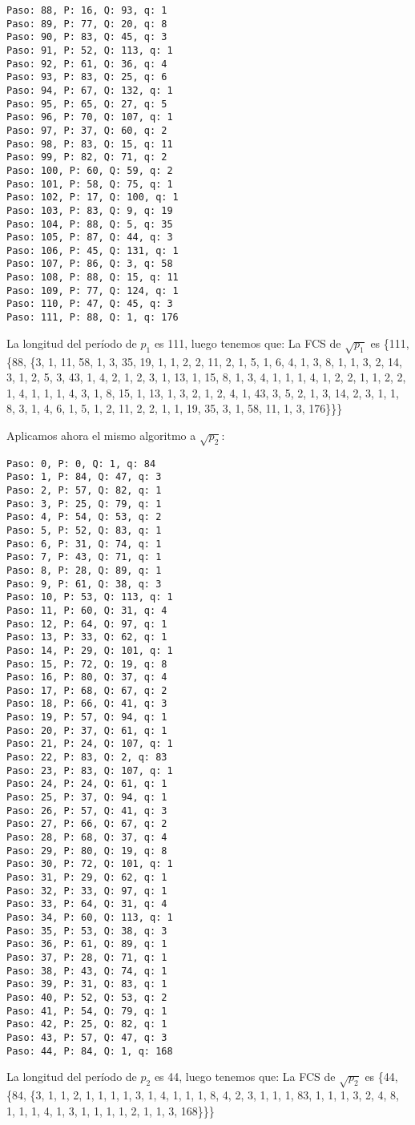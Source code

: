 \documentclass[a4paper]{article}
\begin{document}
\begin{verbatim}
Paso: 88, P: 16, Q: 93, q: 1
Paso: 89, P: 77, Q: 20, q: 8
Paso: 90, P: 83, Q: 45, q: 3
Paso: 91, P: 52, Q: 113, q: 1
Paso: 92, P: 61, Q: 36, q: 4
Paso: 93, P: 83, Q: 25, q: 6
Paso: 94, P: 67, Q: 132, q: 1
Paso: 95, P: 65, Q: 27, q: 5
Paso: 96, P: 70, Q: 107, q: 1
Paso: 97, P: 37, Q: 60, q: 2
Paso: 98, P: 83, Q: 15, q: 11
Paso: 99, P: 82, Q: 71, q: 2
Paso: 100, P: 60, Q: 59, q: 2
Paso: 101, P: 58, Q: 75, q: 1
Paso: 102, P: 17, Q: 100, q: 1
Paso: 103, P: 83, Q: 9, q: 19
Paso: 104, P: 88, Q: 5, q: 35
Paso: 105, P: 87, Q: 44, q: 3
Paso: 106, P: 45, Q: 131, q: 1
Paso: 107, P: 86, Q: 3, q: 58
Paso: 108, P: 88, Q: 15, q: 11
Paso: 109, P: 77, Q: 124, q: 1
Paso: 110, P: 47, Q: 45, q: 3
Paso: 111, P: 88, Q: 1, q: 176
\end{verbatim}

La longitud del período de $p_1$ es 111, luego tenemos que:
La FCS de $\sqrt{p_1}$ es \{111, \{88, \{3, 1, 11, 58, 1, 3, 35, 19, 1, 1, 2, 2, 11, 2, 1, 5, 1, 6, 4, 1, 3, 8, 1, 1, 3, 2, 14, 3, 1, 2, 5, 3, 43, 1, 4, 2, 1, 2, 3, 1, 13, 1, 15, 8, 1, 3, 4, 1, 1, 1, 4, 1, 2, 2, 1, 1, 2, 2, 1, 4, 1, 1, 1, 4, 3, 1, 8, 15, 1, 13, 1, 3, 2, 1, 2, 4, 1, 43, 3, 5, 2, 1, 3, 14, 2, 3, 1, 1, 8, 3, 1, 4, 6, 1, 5, 1, 2, 11, 2, 2, 1, 1, 19, 35, 3, 1, 58, 11, 1, 3, 176\}\}\}

Aplicamos ahora el mismo algoritmo a $\sqrt{p_2}$:

\begin{verbatim}
Paso: 0, P: 0, Q: 1, q: 84
Paso: 1, P: 84, Q: 47, q: 3
Paso: 2, P: 57, Q: 82, q: 1
Paso: 3, P: 25, Q: 79, q: 1
Paso: 4, P: 54, Q: 53, q: 2
Paso: 5, P: 52, Q: 83, q: 1
Paso: 6, P: 31, Q: 74, q: 1
Paso: 7, P: 43, Q: 71, q: 1
Paso: 8, P: 28, Q: 89, q: 1
Paso: 9, P: 61, Q: 38, q: 3
Paso: 10, P: 53, Q: 113, q: 1
Paso: 11, P: 60, Q: 31, q: 4
Paso: 12, P: 64, Q: 97, q: 1
Paso: 13, P: 33, Q: 62, q: 1
Paso: 14, P: 29, Q: 101, q: 1
Paso: 15, P: 72, Q: 19, q: 8
Paso: 16, P: 80, Q: 37, q: 4
Paso: 17, P: 68, Q: 67, q: 2
Paso: 18, P: 66, Q: 41, q: 3
Paso: 19, P: 57, Q: 94, q: 1
Paso: 20, P: 37, Q: 61, q: 1
Paso: 21, P: 24, Q: 107, q: 1
Paso: 22, P: 83, Q: 2, q: 83
Paso: 23, P: 83, Q: 107, q: 1
Paso: 24, P: 24, Q: 61, q: 1
Paso: 25, P: 37, Q: 94, q: 1
Paso: 26, P: 57, Q: 41, q: 3
Paso: 27, P: 66, Q: 67, q: 2
Paso: 28, P: 68, Q: 37, q: 4
Paso: 29, P: 80, Q: 19, q: 8
Paso: 30, P: 72, Q: 101, q: 1
Paso: 31, P: 29, Q: 62, q: 1
Paso: 32, P: 33, Q: 97, q: 1
Paso: 33, P: 64, Q: 31, q: 4
Paso: 34, P: 60, Q: 113, q: 1
Paso: 35, P: 53, Q: 38, q: 3
Paso: 36, P: 61, Q: 89, q: 1
Paso: 37, P: 28, Q: 71, q: 1
Paso: 38, P: 43, Q: 74, q: 1
Paso: 39, P: 31, Q: 83, q: 1
Paso: 40, P: 52, Q: 53, q: 2
Paso: 41, P: 54, Q: 79, q: 1
Paso: 42, P: 25, Q: 82, q: 1
Paso: 43, P: 57, Q: 47, q: 3
Paso: 44, P: 84, Q: 1, q: 168
\end{verbatim}

La longitud del período de $p_2$ es 44, luego tenemos que:
La FCS de $\sqrt{p_2}$ es \{44, \{84, \{3, 1, 1, 2, 1, 1, 1, 1, 3, 1, 4, 1, 1, 1, 8, 4, 2, 3, 1, 1, 1, 83, 1, 1, 1, 3, 2, 4, 8, 1, 1, 1, 4, 1, 3, 1, 1, 1, 1, 2, 1, 1, 3, 168\}\}\}
\end{document}
